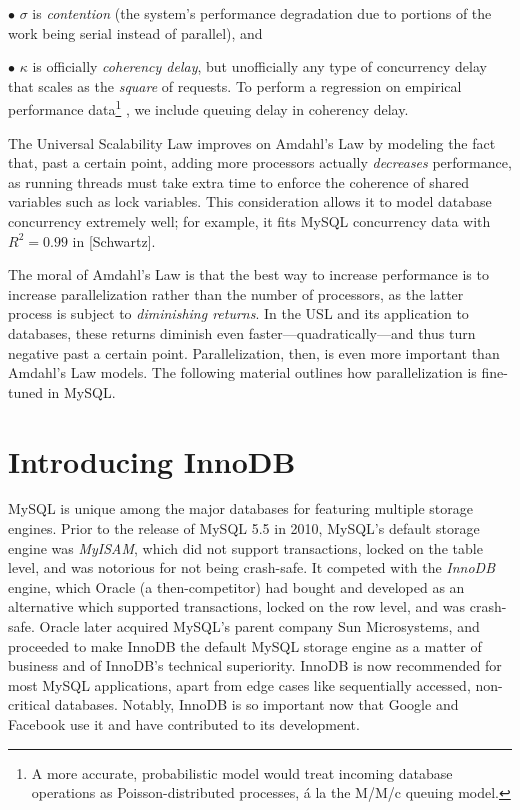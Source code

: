 \documentclass[12pt]{article} %
\begin{document}
$\bullet$ \(\sigma\) is \textsl{contention} (the system's performance degradation due to portions of the work being serial instead of parallel), and 

$\bullet$ \(\kappa\) is officially \textsl{coherency delay}, but unofficially any type of concurrency delay that scales as the \textsl{square} of requests. To perform a regression on empirical performance data\footnote{A more accurate, probabilistic model would treat incoming database operations as Poisson-distributed processes, {\'a} la the M/M/c queuing model.}
	, we include queuing delay in coherency delay. 
	
	The Universal Scalability Law improves on Amdahl's Law by modeling the fact that, past a certain point, adding more processors actually \textsl{decreases} performance, as running threads must take extra time to enforce the coherence of shared variables such as lock variables. This consideration allows it to model database concurrency extremely well; for example, it fits MySQL concurrency data with $R^2 = 0.99$ in [Schwartz].
	
	The moral of Amdahl's Law is that the best way to increase performance is to increase parallelization rather than the number of processors, as the latter process is subject to \textsl{diminishing returns}. In the USL and its application to databases, these returns diminish even faster---quadratically---and thus turn negative past a certain point. Parallelization, then, is even more important than Amdahl's Law models. The following material outlines how parallelization is fine-tuned in MySQL.

\section{Introducing InnoDB}
MySQL is unique among the major databases for featuring multiple storage engines. Prior to the release of MySQL 5.5 in 2010, MySQL's default storage engine was \textsl{MyISAM}, which did not support transactions, locked on the table level, and was notorious for not being crash-safe. It competed with the \textsl{InnoDB} engine, which Oracle (a then-competitor) had bought and developed as an alternative which supported transactions, locked on the row level, and was crash-safe. Oracle later acquired MySQL's parent company Sun Microsystems, and proceeded to make InnoDB the default MySQL storage engine as a matter of business and of InnoDB's technical superiority. InnoDB is now recommended for most MySQL applications, apart from edge cases like sequentially accessed, non-critical databases. Notably, InnoDB is so important now that Google and Facebook use it and have contributed to its development.
\end{document}
